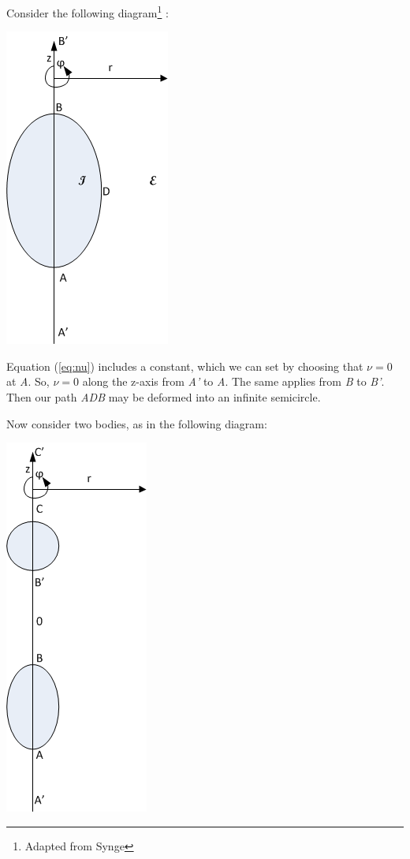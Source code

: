 \documentclass{article}
\begin{document}
Consider the following diagram\footnote{Adapted from Synge} :

\begin{center}
\includegraphics[scale=.75]{Figure1.png}
\end{center}

Equation (\ref{eq:nu}) includes a constant, which we can set by choosing that $\nu=0$ at \emph{A}. So, $\nu=0$ along the z-axis from \emph{A'} to \emph{A}. The same applies from \emph{B} to \emph{B'}. Then our path \emph{ADB} may be deformed into an infinite semicircle.

Now consider two bodies, as in the following diagram:

\begin{center}
\includegraphics[scale=.75]{Figure2.png}
\end{center}
\end{document}
